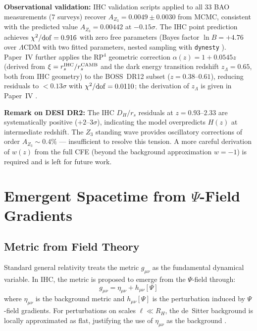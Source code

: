 \textbf{Observational validation:}
IHC validation scripts applied to all 33 BAO measurements (7 surveys) recover
$A_{Z_3} = 0.0049 \pm 0.0030$ from MCMC, consistent with the predicted value
$A_{Z_3} = 0.00442$ at $-0.15\sigma$.
The IHC point prediction achieves $\chi^2/{\rm dof} = 0.916$ with zero free parameters
(Bayes factor $\ln B = +4.76$ over $\Lambda$CDM with two fitted parameters,
nested sampling with \texttt{dynesty} \citep{Speagle2020}).
Paper~IV \citep{Peacock2026d} further applies the RP$^4$ geometric correction
$\alpha(z) = 1 + 0.0545z$ (derived from $\xi = r_s^{\rm IHC}/r_s^{\rm CAMB}$
and the dark energy transition redshift $z_\Lambda = 0.65$, both from IHC geometry)
to the BOSS~DR12 subset ($z = 0.38$--$0.61$), reducing residuals to $<0.13\sigma$
with $\chi^2/{\rm dof} = 0.0110$; the derivation of $z_\Lambda$ is given in
Paper~IV \citep{Peacock2026d}.

\textbf{Remark on DESI DR2:}
The IHC $D_H/r_s$ residuals at $z = 0.93$--$2.33$ are systematically positive
($+2$--$3\sigma$), indicating the model overpredicts $H(z)$ at intermediate redshift.
The $Z_3$ standing wave provides oscillatory corrections of order $A_{Z_3} \sim 0.4\%$
--- insufficient to resolve this tension.
A more careful derivation of $w(z)$ from the full CFE (beyond the background
approximation $w = -1$) is required and is left for future work.

\section{Emergent Spacetime from $\Psi$-Field Gradients}

\subsection{Metric from Field Theory}

Standard general relativity treats the metric $g_{\mu\nu}$ as the fundamental dynamical variable. In IHC, the metric is proposed to emerge from the $\Psi$-field through:
\begin{equation}
g_{\mu\nu} = \eta_{\mu\nu} + h_{\mu\nu}[\Psi]
\label{eq:emergent_metric}
\end{equation}
where $\eta_{\mu\nu}$ is the background metric and $h_{\mu\nu}[\Psi]$ is the perturbation induced by $\Psi$-field gradients. For perturbations on scales $\ell \ll R_H$, the de~Sitter background is locally approximated as flat, justifying the use of $\eta_{\mu\nu}$ as the background \citep{Carroll2004}.

